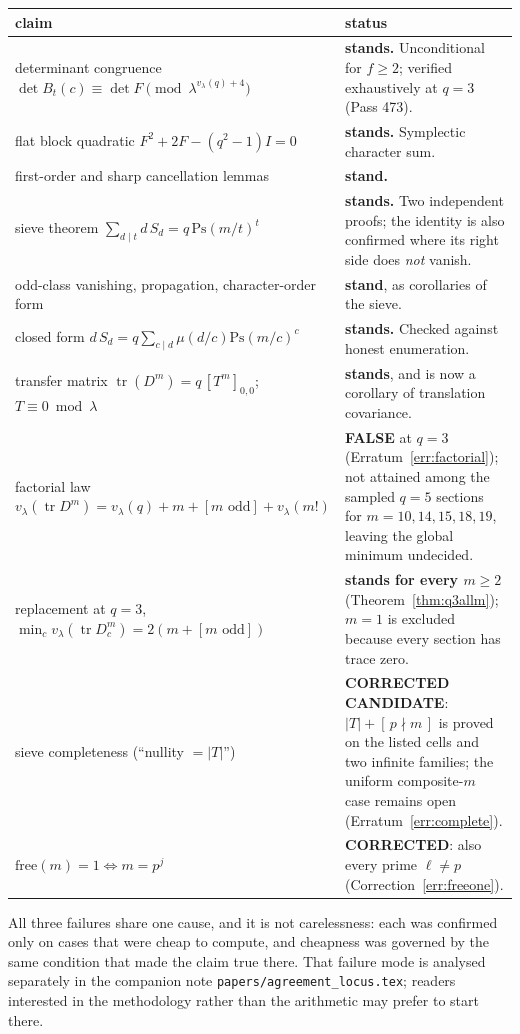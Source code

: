 \documentclass[11pt]{article}
\theoremstyle{plain}
\theoremstyle{definition}
\newcommand{\tr}{\operatorname{tr}}
\newcommand{\vlam}{v_\lambda}
\begin{document}
\begin{center}\small
\begin{tabular}{@{}p{}p{}@{}}
\toprule
claim & status \\
\midrule
determinant congruence
$\det B_t(c)\equiv\det F \pmod{\lambda^{\vlam(q)+4}}$
& \textbf{stands.} Unconditional for $f\ge2$; verified exhaustively at $q=3$
  (Pass 473). \\
flat block quadratic $F^2+2F-(q^2-1)I=0$ & \textbf{stands.} Symplectic
  character sum. \\
first-order and sharp cancellation lemmas & \textbf{stand.} \\
sieve theorem $\sum_{d\mid t}d\,S_d=q\,\mathrm{Ps}(m/t)^t$ &
  \textbf{stands.} Two independent proofs; the identity is also confirmed
  where its right side does \emph{not} vanish. \\
odd-class vanishing, propagation, character-order form &
  \textbf{stand}, as corollaries of the sieve. \\
closed form $d\,S_d=q\sum_{c\mid d}\mu(d/c)\mathrm{Ps}(m/c)^c$ &
  \textbf{stands.} Checked against honest enumeration. \\
transfer matrix $\tr(D^m)=q\,[T^m]_{0,0}$; $T\equiv0\bmod\lambda$ &
  \textbf{stands}, and is now a corollary of translation covariance. \\
\midrule
factorial law
$\vlam(\tr D^m)=\vlam(q)+m+[m\text{ odd}]+\vlam(m!)$ &
  \textbf{FALSE} at $q=3$ (Erratum~\ref{err:factorial}); not attained among
  the sampled $q=5$ sections for $m=10,14,15,18,19$, leaving the global
  minimum undecided. \\
replacement at $q=3$,
$\min_c\vlam(\tr D_c^m)=2(m+[m\text{ odd}])$ &
  \textbf{stands for every $m\ge2$} (Theorem~\ref{thm:q3allm}); $m=1$ is
  excluded because every section has trace zero. \\
sieve completeness (``nullity $=\lvert T\rvert$'') &
  \textbf{CORRECTED CANDIDATE}: $\lvert T\rvert+[\,p\nmid m\,]$ is proved
  on the listed cells and two infinite families; the uniform composite-$m$
  case remains open (Erratum~\ref{err:complete}). \\
$\mathrm{free}(m)=1\iff m=p^{j}$ &
  \textbf{CORRECTED}: also every prime $\ell\neq p$
  (Correction~\ref{err:freeone}). \\
\bottomrule
\end{tabular}
\end{center}

\noindent All three failures share one cause, and it is not carelessness: each
was confirmed only on cases that were cheap to compute, and cheapness was
governed by the same condition that made the claim true there. That failure
mode is analysed separately in the companion note
\texttt{papers/agreement\_locus.tex}; readers interested in the methodology
rather than the arithmetic may prefer to start there.
\end{document}
